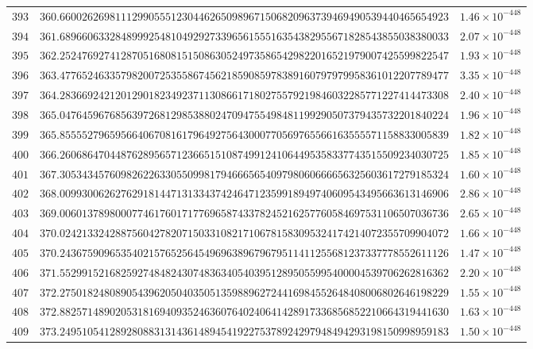\documentclass[12pt,reqno]{amsart}
\theoremstyle{remark}
\begin{document}
\begin{longtable}{clc}
$393$ & $360.6600262698111299055512304462650989671506820963739469490539440465654923$ & $1.46\times 10^{-448}$ \\
$394$ & $361.6896606332848999254810492927339656155516354382955671828543855038380033$ & $2.07\times 10^{-448}$ \\
$395$ & $362.2524769274128705168081515086305249735865429822016521979007425599822547$ & $1.93\times 10^{-448}$ \\
$396$ & $363.4776524633579820072535586745621859085978389160797979958361012207789477$ & $3.35\times 10^{-448}$ \\
$397$ & $364.2836692421201290182349237113086617180275579219846032285771227414473308$ & $2.40\times 10^{-448}$ \\
$398$ & $365.0476459676856397268129853880247094755498481199290507379435732201840224$ & $1.96\times 10^{-448}$ \\
$399$ & $365.8555527965956640670816179649275643000770569765566163555571158833005839$ & $1.82\times 10^{-448}$ \\
$400$ & $366.2606864704487628956571236651510874991241064495358337743515509234030725$ & $1.85\times 10^{-448}$ \\
$401$ & $367.3053434576098262263305509981794666565409798060666656325603617279185324$ & $1.60\times 10^{-448}$ \\
$402$ & $368.0099300626276291814471313343742464712359918949740609543495663613146906$ & $2.86\times 10^{-448}$ \\
$403$ & $369.0060137898000774617601717769658743378245216257760584697531106507036736$ & $2.65\times 10^{-448}$ \\
$404$ & $370.0242133242887560427820715033108217106781583095324174214072355709904072$ & $1.66\times 10^{-448}$ \\
$405$ & $370.2436759096535402157652564549696389679679511411255681237337778552611126$ & $1.47\times 10^{-448}$ \\
$406$ & $371.5529915216825927484824307483634054039512895055995400004539706262816362$ & $2.20\times 10^{-448}$ \\
$407$ & $372.2750182480890543962050403505135988962724416984552648408006802646198229$ & $1.55\times 10^{-448}$ \\
$408$ & $372.8825714890205318169409352463607640240641428917336856852210664319441630$ & $1.63\times 10^{-448}$ \\
$409$ & $373.2495105412892808831314361489454192275378924297948494293198150998959183$ & $1.50\times 10^{-448}$ \\

\end{longtable}
\end{document}
